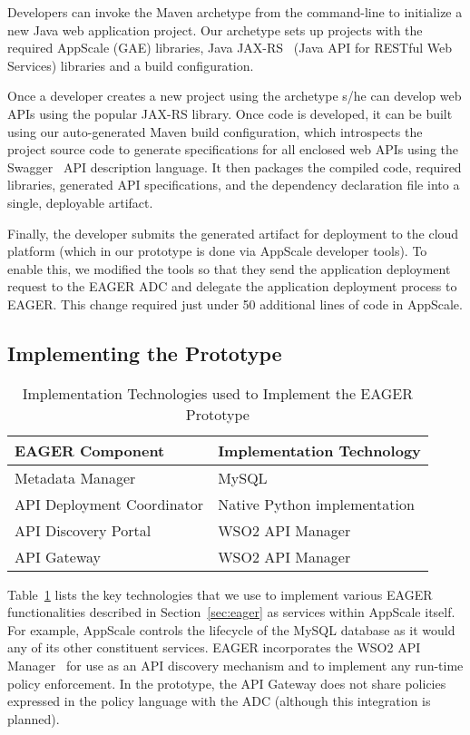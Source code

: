 Developers can invoke the Maven archetype from the command-line to initialize
a new Java web application project. Our archetype sets up projects with the
required AppScale (GAE) libraries, Java JAX-RS~\cite{jaxrs} (Java API for RESTful Web
Services) libraries and a build configuration.

Once a developer creates a new project using the archetype s/he can develop
web APIs using the popular JAX-RS library. Once code is developed, it can be built
using our auto-generated Maven build configuration, which introspects the
project source code to generate specifications for all enclosed web APIs using
the Swagger~\cite{swagger} API description language. 
It then packages the compiled
code, required libraries, generated API specifications, and the dependency
declaration file into a single, deployable artifact.

Finally, the developer submits the generated artifact for deployment to the
cloud platform (which in our prototype is done via AppScale developer tools). 
To enable this, we modified the tools so that they
send the application deployment request to the EAGER ADC and
delegate the application deployment process to EAGER. This change required
just under 50 additional lines of code in AppScale.

\subsection{Implementing the Prototype}

\begin{table}[t]
\begin{center}
\begin{tabular}{| p{3cm} | p{3.5cm} |}
\hline
EAGER Component & Implementation Technology\\ \hline
Metadata Manager & MySQL~\cite{mysql}\\
API Deployment Coordinator & Native Python implementation\\
API Discovery Portal & WSO2 API Manager~\cite{wso2am}\\
API Gateway & WSO2 API Manager\\
\hline
\end{tabular}
\end{center}
\caption{Implementation Technologies used to Implement the EAGER Prototype}
\label{tab:imp-tech}
\end{table}

Table~\ref{tab:imp-tech} lists the key technologies that we use to implement 
various EAGER functionalities described in
Section~\ref{sec:eager} as services within AppScale itself.  For example, AppScale
controls the lifecycle of the MySQL database as it would any of its other
constituent services.  EAGER incorporates the WSO2 API Manager~\cite{wso2am} for
use as an API discovery mechanism and to implement any run-time policy 
enforcement.  In the prototype, the API Gateway does not share policies
expressed in the policy language with the ADC (although this integration is
planned).

